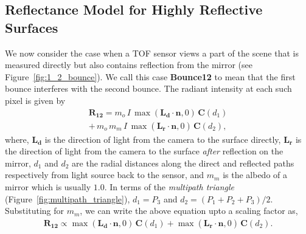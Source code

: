 \subsection{Reflectance Model for Highly Reflective Surfaces}
We now consider the case when a TOF sensor views a part of the scene that is measured directly but also contains reflection from the mirror (see Figure~\ref{fig:1_2_bounce}). We call this case \textbf{Bounce12} to mean that the first bounce interferes with the second bounce. The radiant intensity at each such pixel is given by
%
\begin{align}
\mathbf{R_{12}} = m_o \, I \, \max{(\mathbf{L_d} \cdot \mathbf{n}, 0)} \, \mathbf{C}(d_1)\nonumber \\
					 + \, m_o \, m_m \, I \, \max{(\mathbf{L_r} \cdot \mathbf{n}, 0)} \, \mathbf{C}(d_2),
\end{align}
%
where, $\mathbf{L_d}$ is the direction of light from the camera to the surface directly,
$\mathbf{L_r}$ is the direction of light from the camera to the surface \emph{after} reflection on the mirror, $d_1$ and $d_2$ are the radial distances along the direct and reflected paths respectively from light source back to the sensor, and $m_m$ is the albedo of a mirror which is usually $1.0$.
%
In terms of the \emph{multipath triangle} (Figure~\ref{fig:multipath_triangle}), $d_1 = P_3$ and $d_2 = (P_1 + P_2 + P_3) / 2.$
Substituting for $m_m$, we can write the above equation upto a scaling factor as,
%
\begin{align}
\mathbf{R_{12}} \propto \max{(\mathbf{L_d} \cdot \mathbf{n}, 0)} \, \mathbf{C}(d_1) 
					 + \max{(\mathbf{L_r} \cdot \mathbf{n}, 0)} \, \mathbf{C}(d_2).
\end{align}
%

